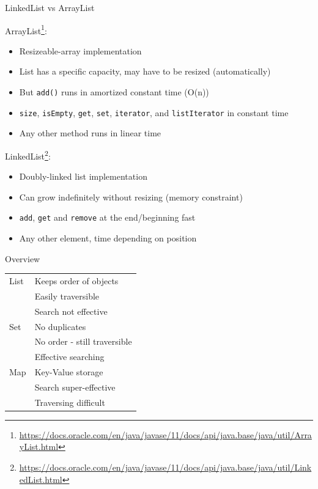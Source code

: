	
	\begin{frame}[allowframebreaks]{LinkedList vs ArrayList}
		
		ArrayList\footnote{ \url{https://docs.oracle.com/en/java/javase/11/docs/api/java.base/java/util/ArrayList.html}}:
		\begin{itemize}
			\item Resizeable-array implementation
			\item List has a specific capacity, may have to be resized (automatically)
			\item But \texttt{add()} runs in amortized constant time (O(n))
			\item \texttt{size}, \texttt{isEmpty}, \texttt{get}, \texttt{set}, \texttt{iterator}, and \texttt{listIterator} in constant time
			\item Any other method runs in linear time
		\end{itemize}
		
		\framebreak
		LinkedList\footnote{\url{https://docs.oracle.com/en/java/javase/11/docs/api/java.base/java/util/LinkedList.html}}:
		\begin{itemize}
			\item Doubly-linked list implementation
			\item Can grow indefinitely without resizing (memory constraint)
			\item \texttt{add}, \texttt{get} and \texttt{remove} at the end/beginning fast
			\item Any other element, time depending on position
		\end{itemize}
		
		
	\end{frame}
	\begin{frame}{Overview}
		\begin{center}
			\begin{tabular}{ l | l }
				List & Keeps order of objects \\
				& Easily traversible \\
				& Search not effective \\
				\hline
				Set  & No duplicates \\
				& No order - still traversible \\
				& Effective searching \\
				\hline
				Map  & Key-Value storage \\
				& Search super-effective \\
				& Traversing difficult
				
			\end{tabular}
		\end{center}
	\end{frame}
	
	
		
